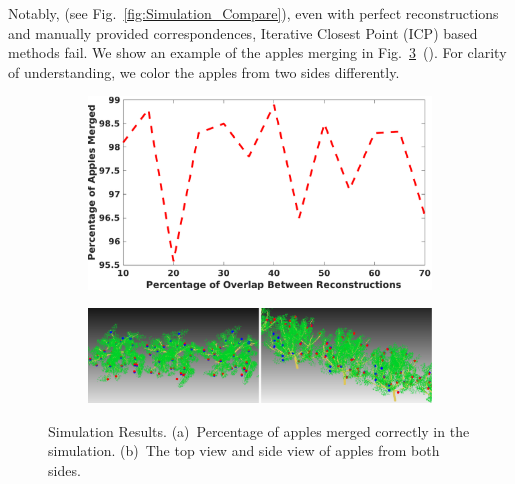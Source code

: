 Notably, (see Fig.~\ref{fig:Simulation_Compare}), even with perfect reconstructions and manually provided correspondences, Iterative Closest Point (ICP) based methods fail. We show an example of the apples merging in Fig.~\ref{fig:simulation}~(). For clarity of understanding, we color the apples from two sides differently.

\begin{figure}[!htbp]
\centering
\begin{subfigure}[b]{.31\columnwidth}
        \centering
            \includegraphics[width =\textwidth]{figures/merge_both/simresult.pdf}           
   \caption{\label{fig:simresult}}   
\end{subfigure}
\begin{subfigure}[b]{.65\columnwidth}
        \centering
            \includegraphics[width =\textwidth]{figures/merge_both/Apple_Views.pdf}           
   \caption{\label{fig:Apple_Views}}   
   \end{subfigure}
  \caption[Simulation results for merging reconstructions]{Simulation Results. (a)~Percentage of apples merged correctly in the simulation. (b)~The top view and side view of apples from both sides.\label{fig:simulation}}
\end{figure}




